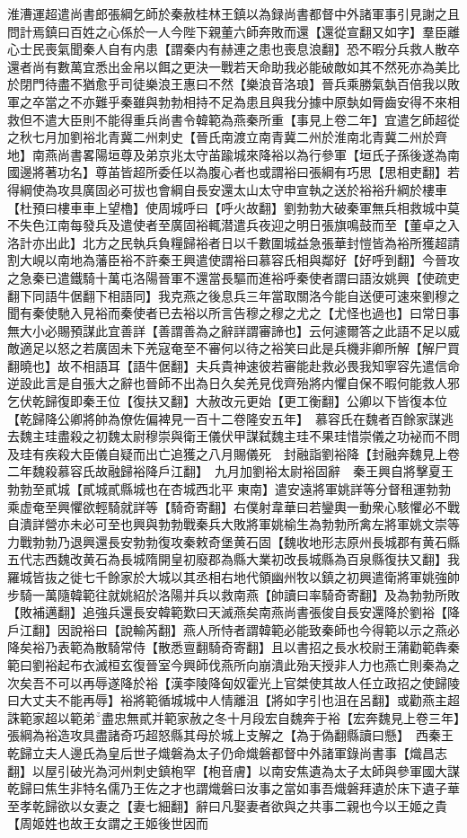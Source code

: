 淮漕運超遣尚書郎張綱乞師於秦赦桂林王鎮以為録尚書都督中外諸軍事引見謝之且問計焉鎮曰百姓之心係於一人今陛下親董六師奔敗而還【還從宣翻又如字】羣臣離心士民喪氣聞秦人自有内患【謂秦内有赫連之患也喪息浪翻】恐不暇分兵救人散卒還者尚有數萬宜悉出金帛以餌之更決一戰若天命助我必能破敵如其不然死亦為美比於閉門待盡不猶愈乎司徒樂浪王惠曰不然【樂浪音洛琅】晉兵乘勝氣埶百倍我以敗軍之卒當之不亦難乎秦雖與勃勃相持不足為患且與我分據中原埶如脣齒安得不來相救但不遣大臣則不能得重兵尚書令韓範為燕秦所重【事見上卷二年】宜遣乞師超從之秋七月加劉裕北青冀二州刺史【晉氏南渡立南青冀二州於淮南北青冀二州於齊地】南燕尚書畧陽垣尊及弟京兆太守苖踰城來降裕以為行參軍【垣氏子孫後遂為南國邊將著功名】尊苖皆超所委任以為腹心者也或謂裕曰張綱有巧思【思相吏翻】若得綱使為攻具廣固必可拔也會綱自長安還太山太守申宣執之送於裕裕升綱於樓車【杜預曰樓車車上望櫓】使周城呼曰【呼火故翻】劉勃勃大破秦軍無兵相救城中莫不失色江南每發兵及遣使者至廣固裕輒潜遣兵夜迎之明日張旗鳴鼓而至【董卓之入洛計亦出此】北方之民執兵負糧歸裕者日以千數圍城益急張華封愷皆為裕所獲超請割大峴以南地為藩臣裕不許秦王興遣使謂裕曰慕容氏相與鄰好【好呼到翻】今晉攻之急秦已遣鐵騎十萬屯洛陽晉軍不還當長驅而進裕呼秦使者謂曰語汝姚興【使疏吏翻下同語牛倨翻下相語同】我克燕之後息兵三年當取關洛今能自送便可速來劉穆之聞有秦使馳入見裕而秦使者已去裕以所言告穆之穆之尤之【尤怪也過也】曰常日事無大小必賜預謀此宜善詳【善謂善為之辭詳謂審諦也】云何遽爾答之此語不足以威敵適足以怒之若廣固未下羌寇奄至不審何以待之裕笑曰此是兵機非卿所解【解尸買翻曉也】故不相語耳【語牛倨翻】夫兵貴神速彼若審能赴救必畏我知寧容先遣信命逆設此言是自張大之辭也晉師不出為日久矣羌見伐齊殆將内懼自保不暇何能救人邪　乞伏乾歸復即秦王位【復扶又翻】大赦改元更始【更工衡翻】公卿以下皆復本位【乾歸降公卿將帥為僚佐偏裨見一百十二卷隆安五年】　慕容氏在魏者百餘家謀逃去魏主珪盡殺之初魏太尉穆崇與衛王儀伏甲謀弑魏主珪不果珪惜崇儀之功袐而不問及珪有疾殺大臣儀自疑而出亡追獲之八月賜儀死　封融詣劉裕降【封融奔魏見上卷二年魏殺慕容氏故融歸裕降戶江翻】　九月加劉裕太尉裕固辭　秦王興自將擊夏王勃勃至貳城【貳城貳縣城也在杏城西北平東南】遣安遠將軍姚詳等分督租運勃勃乘虚奄至興懼欲輕騎就詳等【騎奇寄翻】右僕射韋華曰若鑾輿一動衆心駭懼必不戰自潰詳營亦未必可至也興與勃勃戰秦兵大敗將軍姚榆生為勃勃所禽左將軍姚文崇等力戰勃勃乃退興還長安勃勃復攻秦敕奇堡黄石固【魏收地形志原州長城郡有黄石縣五代志西魏改黄石為長城隋開皇初廢郡為縣大業初改長城縣為百泉縣復扶又翻】我羅城皆抜之徙七千餘家於大城以其丞相右地代領幽州牧以鎮之初興遣衛將軍姚強帥步騎一萬隨韓範往就姚紹於洛陽并兵以救南燕【帥讀曰率騎奇寄翻】及為勃勃所敗【敗補邁翻】追強兵還長安韓範歎曰天滅燕矣南燕尚書張俊自長安還降於劉裕【降戶江翻】因說裕曰【說輸芮翻】燕人所恃者謂韓範必能致秦師也今得範以示之燕必降矣裕乃表範為散騎常侍【散悉亶翻騎奇寄翻】且以書招之長水校尉王蒲勸範犇秦範曰劉裕起布衣滅桓玄復晉室今興師伐燕所向崩潰此殆天授非人力也燕亡則秦為之次矣吾不可以再辱遂降於裕【漢李陵降匈奴霍光上官桀使其故人任立政招之使歸陵曰大丈夫不能再辱】裕將範循城城中人情離沮【將如字引也沮在呂翻】或勸燕主超誅範家超以範弟盡忠無貳并範家赦之冬十月段宏自魏奔于裕【宏奔魏見上卷三年】張綱為裕造攻具盡諸奇巧超怒縣其母於城上支解之【為于偽翻縣讀曰懸】　西秦王乾歸立夫人邊氏為皇后世子熾磐為太子仍命熾磐都督中外諸軍錄尚書事【熾昌志翻】以屋引破光為河州刺史鎮枹罕【枹音膚】以南安焦遺為太子太師與參軍國大謀乾歸曰焦生非特名儒乃王佐之才也謂熾磐曰汝事之當如事吾熾磐拜遺於床下遺子華至孝乾歸欲以女妻之【妻七細翻】辭曰凡娶妻者欲與之共事二親也今以王姬之貴【周姬姓也故王女謂之王姬後世因而